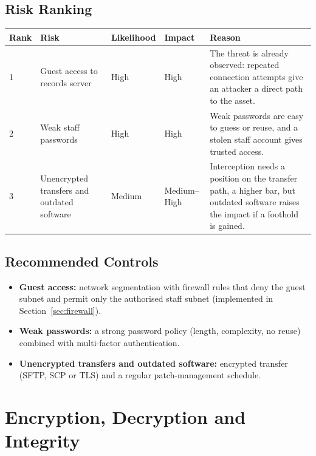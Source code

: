 \documentclass[11pt]{article}
\begin{document}
\subsection{Risk Ranking}
\begin{longtable}{p{1.2cm}p{4cm}p{1.8cm}p{1.8cm}p{5.5cm}}
\toprule
Rank & Risk & Likelihood & Impact & Reason \\
\midrule
\endhead
1 & Guest access to records server & High & High & The threat is already observed: repeated connection attempts give an attacker a direct path to the asset. \\
2 & Weak staff passwords & High & High & Weak passwords are easy to guess or reuse, and a stolen staff account gives trusted access. \\
3 & Unencrypted transfers and outdated software & Medium & Medium--High & Interception needs a position on the transfer path, a higher bar, but outdated software raises the impact if a foothold is gained. \\
\bottomrule
\end{longtable}

\subsection{Recommended Controls}
\begin{itemize}
\item \textbf{Guest access:} network segmentation with firewall rules that deny the guest subnet and permit only the authorised staff subnet (implemented in Section~\ref{sec:firewall}).
\item \textbf{Weak passwords:} a strong password policy (length, complexity, no reuse) combined with multi-factor authentication.
\item \textbf{Unencrypted transfers and outdated software:} encrypted transfer (SFTP, SCP or TLS) and a regular patch-management schedule.
\end{itemize}

\section{Encryption, Decryption and Integrity}
\label{sec:crypto}
\end{document}

